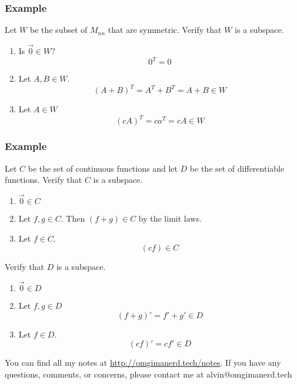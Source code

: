 \documentclass{math}
\begin{document}
\subsubsection*{Example}
Let \( W \) be the subset of \( M_{nn} \) that are symmetric. Verify that
\( W \) is a subspace.
\begin{enumerate}
  \item Is \( \vec{0}\in W \)?
  \[ 0^T = 0 \]
  \item Let \( A,B\in W \).
  \[ (A+B)^T = A^T+B^T = A+B\in W \]
  \item Let \( A\in W \)
  \[ (cA)^T = ca^T = cA\in W \]
\end{enumerate}

\subsubsection*{Example}
Let \( C \) be the set of continuous functions and let \( D \) be the set of
differentiable functions. Verify that \( C \) is a subspace.
\begin{enumerate}
  \item \( \vec{0}\in C \)
  \item Let \( f,g\in C \). Then \( (f+g)\in C \) by the limit laws.
  \item Let \( f\in C \).
  \[ (cf)\in C \]
\end{enumerate}
Verify that \( D \) is a subspace.
\begin{enumerate}
  \item \( \vec{0}\in D \)
  \item Let \( f,g\in D \)
  \[ (f+g)' = f'+g'\in D \]
  \item Let \( f\in D \).
  \[ (cf)' = cf'\in D \]
\end{enumerate}

\begin{center}
  You can find all my notes at \url{http://omgimanerd.tech/notes}. If you have
  any questions, comments, or concerns, please contact me at
  alvin@omgimanerd.tech
\end{center}
\end{document}
